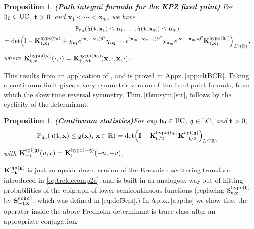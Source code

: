 \documentclass[letterpaper,reqno,11pt,oneside,final]{amsart}
\newtheorem{prop}[thm]{Proposition}
\theoremstyle{definition}
\newcommand{\fh}{\mathfrak{h}}
\newcommand{\fg}{\mathfrak{g}}
\newcommand{\pp}{\mathbb{P}}
\newcommand{\rr}{\mathbb{R}}
\newcommand{\p}{\partial}
\newcommand{\uptext}[1]{\text{\upshape{#1}}}
\DeclareMathOperator{\epi}{\uptext{epi}}
\DeclareMathOperator{\hypo}{\uptext{hypo}}
\DeclareMathOperator{\UC}{\uptext{UC}}
\DeclareMathOperator{\LC}{\uptext{LC}}
\newcommand{\fT}{\mathbf{S}}
\newcommand{\ft}{\mathbf{t}}
\newcommand{\fx}{\mathbf{x}}
\newcommand{\fa}{\mathbf{a}}
\newcommand{\fK}{\mathbf{K}}
\newcommand{\fI}{\mathbf{I}}
\renewcommand{\P}{\chi}
\numberwithin{equation}{section}
\begin{document}
\begin{prop}\label{prop:pathint-fixedpt}{\bf (Path integral formula for the KPZ fixed point)}
\enspace For $\fh_0\in\UC$, $\ft>0$, and $\fx_1<\dotsm<\fx_m$, we have
\begin{multline}\label{eq:twosided-path}
\pp_{\fh_0}\!\left(\fh(\ft,\fx_1)\leq\fa_1,\dotsc,\fh(\ft,\fx_m)\leq\fa_m\right)\\
=\det\!\left(\fI-\fK^{\hypo(\fh_0)}_{\ft,\fx_1}+\bar\P_{\fa_1}e^{(\fx_2-\fx_1)\p^2}\bar\P_{\fa_2}\dotsm e^{(\fx_m-\fx_{m-1})\p^2}\bar\P_{\fa_m}e^{(\fx_1-\fx_m)\p^2}\fK^{\hypo(\fh_0)}_{\ft,\fx_1}\right)_{L^2(\rr)},
\end{multline}
where
$\fK^{\hypo(\fh_0)}_{\ft,\fx}(\cdot,\cdot)=\fK^{\hypo(\fh_0)}_{\ft,\uptext{ext}}(\fx,\cdot,\fx,\cdot)$.
\end{prop}
This results from an application of \cite[Thm.\,3.3]{bcr}, and is proved in Appx.\,\ref{app:altBCR}.
Taking a continuum limit gives a very symmetric version of the fixed point formula, from which the skew time reversal symmetry, Thm.\,\ref{thm:sym}\eqref{str}, follows by the cyclicity of the  determinant. 

\begin{prop}{\bf (Continuum statistics)}\label{thm:contstats}
\enspace For any $\fh_0\in\UC$, $\fg\in \LC$, and $\ft>0$,
\begin{equation}\label{eq:fpform}
 \pp_{\fh_0}( \fh(\ft, \fx) \le \fg(\fx),\,\fx\in\rr) = \det\!\left(\fI-\fK^{\hypo(\fh_0)}_{\ft/2}\fK^{\epi(\fg)}_{-\ft/2}\right)_{L^2(\rr)}
\end{equation}
with $\fK^{\epi(\fg)}_{-\ft}(u,v)=\fK^{\hypo(-\fg)}_\ft(-u,-v)$.
\end{prop}

$\fK^{\epi(\fg)}_{-\ft}$ is just an upside down version of the Brownian scattering transform introduced in \eqref{eq:trcldecomp2a}, and is built in an analogous way out of hitting probabilities of the epigraph of lower semicontinuous functions (replacing $\fT^{\hypo(\fh)}_{\ft,\fx}$ by $\fT^{\epi(\fg)}_{-\ft,\fx}$, which was defined in \eqref{eq:defSepi}.)
In Appx.\,\ref{app:hs} we show that the operator inside the above Fredholm determinant is trace class after an appropriate conjugation.
\end{document}
